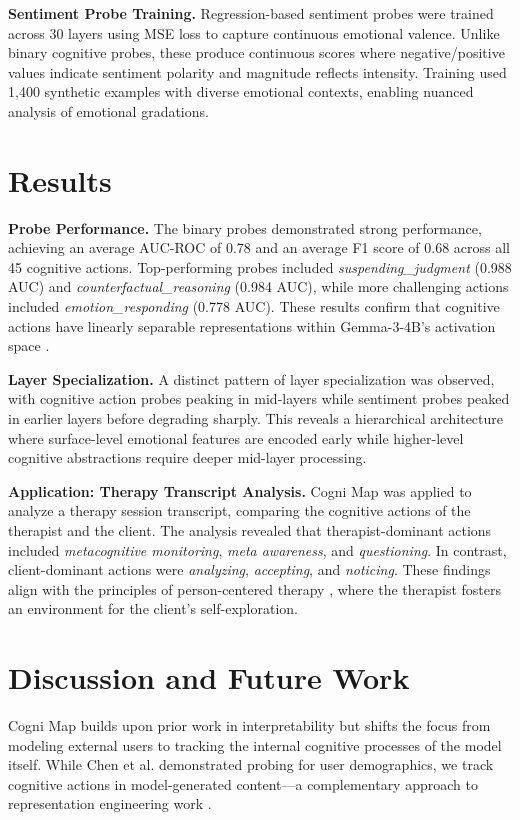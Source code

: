 \documentclass[letterpaper]{article}
\begin{document}
\textbf{Sentiment Probe Training.} Regression-based sentiment probes were trained across 30 layers using MSE loss to capture continuous emotional valence. Unlike binary cognitive probes, these produce continuous scores where negative/positive values indicate sentiment polarity and magnitude reflects intensity. Training used 1,400 synthetic examples with diverse emotional contexts, enabling nuanced analysis of emotional gradations.

\section{Results}

\textbf{Probe Performance.} The binary probes demonstrated strong performance, achieving an average AUC-ROC of 0.78 and an average F1 score of 0.68 across all 45 cognitive actions. Top-performing probes included \textit{suspending\_judgment} (0.988 AUC) and \textit{counterfactual\_reasoning} (0.984 AUC), while more challenging actions included \textit{emotion\_responding} (0.778 AUC). These results confirm that cognitive actions have linearly separable representations within Gemma-3-4B's activation space \cite{alain2016understanding}.

\textbf{Layer Specialization.} A distinct pattern of layer specialization was observed, with cognitive action probes peaking in mid-layers while sentiment probes peaked in earlier layers before degrading sharply. This reveals a hierarchical architecture where surface-level emotional features are encoded early while higher-level cognitive abstractions require deeper mid-layer processing.

\textbf{Application: Therapy Transcript Analysis.} Cogni Map was applied to analyze a therapy session transcript, comparing the cognitive actions of the therapist and the client. The analysis revealed that therapist-dominant actions included \textit{metacognitive monitoring}, \textit{meta awareness}, and \textit{questioning}. In contrast, client-dominant actions were \textit{analyzing}, \textit{accepting}, and \textit{noticing}. These findings align with the principles of person-centered therapy \cite{rogers1951client}, where the therapist fosters an environment for the client's self-exploration.

\section{Discussion and Future Work}

Cogni Map builds upon prior work in interpretability \cite{alain2016understanding,chen2024designing} but shifts the focus from modeling external users to tracking the internal cognitive processes of the model itself. While Chen et al. demonstrated probing for user demographics, we track cognitive actions in model-generated content—a complementary approach to representation engineering work \cite{zou2023representation}.
\end{document}
